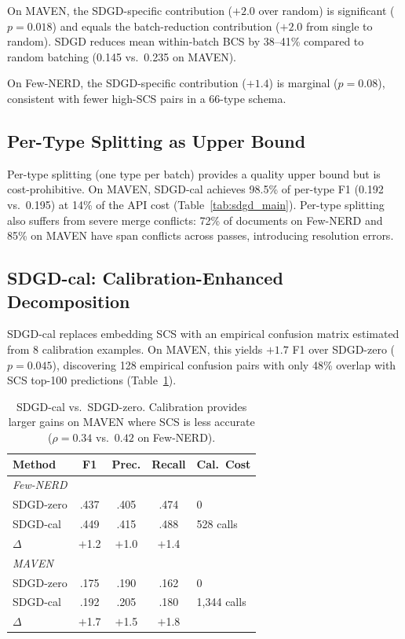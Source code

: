 \documentclass[11pt,a4paper]{article}
\begin{document}
On MAVEN, the SDGD-specific contribution ($+2.0$ over random) is significant ($p=0.018$) and equals the batch-reduction contribution ($+2.0$ from single to random). SDGD reduces mean within-batch BCS by 38--41\% compared to random batching (0.145 vs.\ 0.235 on MAVEN).

On Few-NERD, the SDGD-specific contribution ($+1.4$) is marginal ($p=0.08$), consistent with fewer high-SCS pairs in a 66-type schema.

\subsection{Per-Type Splitting as Upper Bound}

Per-type splitting (one type per batch) provides a quality upper bound but is cost-prohibitive. On MAVEN, SDGD-cal achieves 98.5\% of per-type F1 (0.192 vs.\ 0.195) at 14\% of the API cost (Table~\ref{tab:sdgd_main}). Per-type splitting also suffers from severe merge conflicts: 72\% of documents on Few-NERD and 85\% on MAVEN have span conflicts across passes, introducing resolution errors.

\subsection{SDGD-cal: Calibration-Enhanced Decomposition}

SDGD-cal replaces embedding SCS with an empirical confusion matrix estimated from 8 calibration examples. On MAVEN, this yields $+1.7$ F1 over SDGD-zero ($p=0.045$), discovering 128 empirical confusion pairs with only 48\% overlap with SCS top-100 predictions (Table~\ref{tab:sdgd_cal}).

\begin{table}[t]
\centering
\small
\caption{SDGD-cal vs.\ SDGD-zero. Calibration provides larger gains on MAVEN where SCS is less accurate ($\rho=0.34$ vs.\ $0.42$ on Few-NERD).}
\label{tab:sdgd_cal}
\begin{tabular}{lcccl}
\toprule
Method & F1 & Prec. & Recall & Cal.\ Cost \\
\midrule
\multicolumn{5}{l}{\emph{Few-NERD}} \\
SDGD-zero & .437 & .405 & .474 & 0 \\
SDGD-cal & .449 & .415 & .488 & 528 calls \\
$\Delta$ & $+$1.2 & $+$1.0 & $+$1.4 & \\
\midrule
\multicolumn{5}{l}{\emph{MAVEN}} \\
SDGD-zero & .175 & .190 & .162 & 0 \\
SDGD-cal & .192 & .205 & .180 & 1,344 calls \\
$\Delta$ & $+$1.7 & $+$1.5 & $+$1.8 & \\
\bottomrule
\end{tabular}
\end{table}
\end{document}
